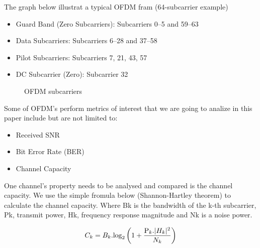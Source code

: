 \documentclass[conference]{IEEEtran}
\begin{document}
      The graph below illustrat a typical OFDM fram (64-subcarrier example)
      
      	\begin{itemize}
      	\item Guard Band (Zero Subcarriers): Subcarriers 0–5 and 59–63
	\item Data Subcarriers: Subcarriers 6–28 and 37–58
	\item Pilot Subcarriers: Subcarriers 7, 21, 43, 57
	\item DC Subcarrier (Zero): Subcarrier 32
	\end{itemize}

	\begin{figure}[H]
	    		\centering
	    		\caption{OFDM subcarriers}
		\end{figure}
		
Some of OFDM's perform metrics of interest that we are going to analize in this paper include but are not limited to:

\begin{itemize}
\item Received SNR
\item Bit Error Rate (BER)
\item Channel Capacity
\end{itemize}

One channel's property needs to be analysed and compared is the channel capacity. We use the simple fromula below (Shannon-Hartley theorem) to calculate the channel capacity. 
Where Bk is the bandwidth of the k-th subcarrier, Pk, transmit power, Hk, frequency response magnitude and Nk is a noise power.   
	

			\begin{equation}
			C_{k} = B_{k}.\text{log}_2\left(1 +\frac{ \text P_{k}.|H_{k}|^2}{N_{k}}\right)
	    		\label{eq:ofdm_capacity}
	    		\end{equation}
\end{document}
